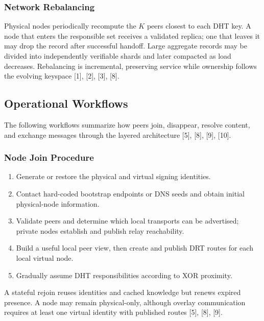 \documentclass[12pt,a4paper]{article}
\begin{document}
\subsubsection{Network Rebalancing}

Physical nodes periodically recompute the $K$ peers closest to each DHT key. A node
that enters the responsible set receives a validated replica; one that leaves it may
drop the record after successful handoff. Large aggregate records may be divided into
independently verifiable shards and later compacted as load decreases. Rebalancing is
incremental, preserving service while ownership follows the evolving keyspace [1],
[2], [3], [8].





\subsection{Operational Workflows}

The following workflows summarize how peers join, disappear, resolve content, and
exchange messages through the layered architecture [5], [8], [9], [10].

\subsubsection{Node Join Procedure}

\begin{enumerate}
    \item Generate or restore the physical and virtual signing identities.
    \item Contact hard-coded bootstrap endpoints or DNS seeds and obtain initial
    physical-node information.
    \item Validate peers and determine which local transports can be advertised;
    private nodes establish and publish relay reachability.
    \item Build a useful local peer view, then create and publish DRT routes for each
    local virtual node.
    \item Gradually assume DHT responsibilities according to XOR proximity.
\end{enumerate}

A stateful rejoin reuses identities and cached knowledge but renews expired presence.
A node may remain physical-only, although overlay communication requires at least one
virtual identity with published routes [5], [8], [9].
\end{document}
